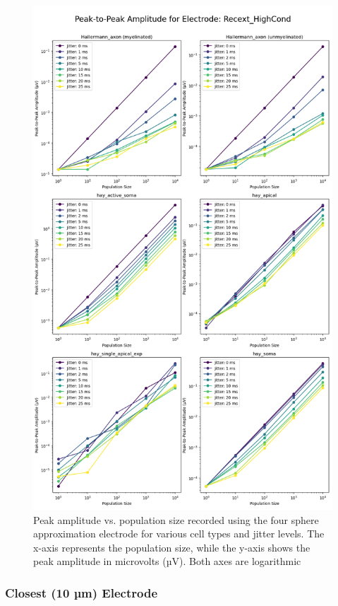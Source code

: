 \documentclass[final, a4paper,masters,en,listoffigures,listoftables,norwegiandates]{NMBU}
\begin{document}
\begin{figure}[p]
    \vspace*{-3cm}
    \centering
    \includegraphics[width=\textwidth]{Figures/PeakAmpEEG.png}
    \caption{Peak amplitude vs. population size recorded using the four sphere approximation electrode for various cell types and jitter levels. The x-axis represents the population size, while the y-axis shows the peak amplitude in microvolts (µV). Both axes are logarithmic}
    \label{fig:PeakAmpEEG}
\end{figure}

\subsubsection{Closest (10 µm) Electrode}
\end{document}
